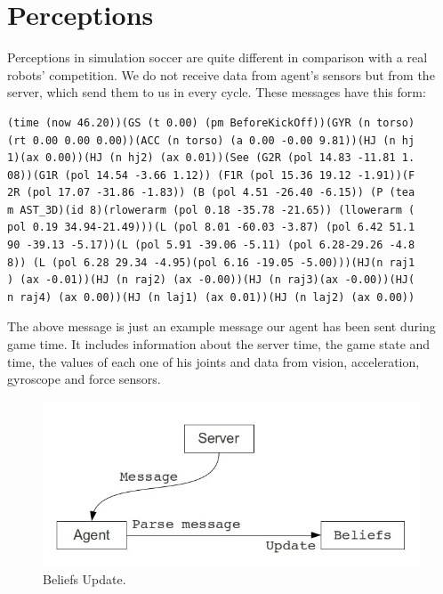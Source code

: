 \section{Perceptions}
Perceptions in simulation soccer are quite different in comparison with a real robots' competition. We do not receive data from agent's sensors but from the server, which send them to us in every cycle. These messages have this form:\\
\begin{verbatim}
(time (now 46.20))(GS (t 0.00) (pm BeforeKickOff))(GYR (n torso)
(rt 0.00 0.00 0.00))(ACC (n torso) (a 0.00 -0.00 9.81))(HJ (n hj
1)(ax 0.00))(HJ (n hj2) (ax 0.01))(See (G2R (pol 14.83 -11.81 1.
08))(G1R (pol 14.54 -3.66 1.12)) (F1R (pol 15.36 19.12 -1.91))(F
2R (pol 17.07 -31.86 -1.83)) (B (pol 4.51 -26.40 -6.15)) (P (tea
m AST_3D)(id 8)(rlowerarm (pol 0.18 -35.78 -21.65)) (llowerarm (
pol 0.19 34.94-21.49)))(L (pol 8.01 -60.03 -3.87) (pol 6.42 51.1
90 -39.13 -5.17))(L (pol 5.91 -39.06 -5.11) (pol 6.28-29.26 -4.8
8)) (L (pol 6.28 29.34 -4.95)(pol 6.16 -19.05 -5.00)))(HJ(n raj1
) (ax -0.01))(HJ (n raj2) (ax -0.00))(HJ (n raj3)(ax -0.00))(HJ(
n raj4) (ax 0.00))(HJ (n laj1) (ax 0.01))(HJ (n laj2) (ax 0.00))
\end{verbatim}
The above message is just an example message our agent has been sent 
during game time. It includes information about the server time, the game state and time, the values of each one of his joints and data from vision, acceleration, gyroscope and force sensors.
\begin{figure}[!ht]
\centering
  \includegraphics[scale=0.4]{Chapter3/figures/MessagesBeliefs.jpg}
  \caption{Beliefs Update.} 
  \label{fig:BeliefsUpdate}
\end{figure}
\\




